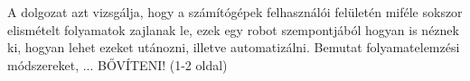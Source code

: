 
A dolgozat azt vizsgálja, hogy a számítógépek felhasználói felületén miféle sokszor elismételt folyamatok zajlanak le, ezek egy robot szempontjából hogyan is néznek ki, hogyan lehet ezeket utánozni, illetve automatizálni. Bemutat folyamatelemzési módszereket, ... BŐVÍTENI! (1-2 oldal)
